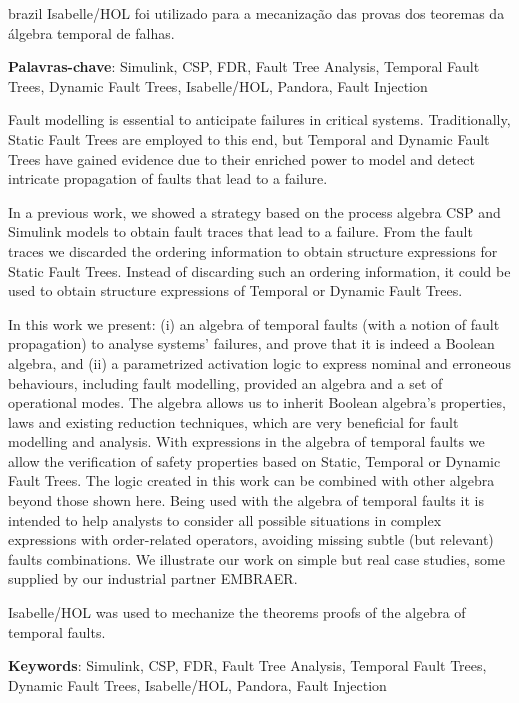\documentclass[12pt,openright,twoside,a4paper,oldfontcommands,english,brazil,final]{abntex2}
\theoremstyle{theo}
\begin{document}
\begin{resumo}[Resumo]
\begin{otherlanguage*}{brazil}
Isabelle/HOL foi utilizado para a mecanização das provas dos teoremas da álgebra temporal de falhas.

\vspace{\onelineskip}
\noindent
\textbf{Palavras-chave}: Simulink, CSP, FDR, Fault Tree Analysis, Temporal Fault Trees, Dynamic Fault Trees, Isabelle/HOL, Pandora, Fault Injection
\end{otherlanguage*}
\end{resumo}



\begin{resumo}
Fault modelling is essential to anticipate failures in critical systems.
Traditionally, Static Fault Trees are employed to this end, but Temporal and Dynamic Fault Trees have gained evidence due to their enriched power to model and detect intricate propagation of faults that lead to a failure.

In a previous work, we showed a strategy based on the process algebra CSP and Simulink models to obtain fault traces that lead to a failure.
From the fault traces we discarded the ordering information to obtain structure expressions for Static Fault Trees.
Instead of discarding such an ordering information, it could be used to obtain structure expressions of Temporal or Dynamic Fault Trees.

In this work we present: (i) an algebra of temporal faults (with a notion of fault propagation) to analyse systems' failures, and prove that it is indeed a Boolean algebra, and (ii) a parametrized activation logic to express nominal and erroneous behaviours, including fault modelling, provided an algebra and a set of operational modes.
The algebra allows us to inherit Boolean algebra's properties, laws and existing reduction techniques, which are very beneficial for fault modelling and analysis.
With expressions in the algebra of temporal faults we allow the verification of safety properties based on Static, Temporal or Dynamic Fault Trees.
The logic created in this work can be combined with other algebra beyond those shown here.
Being used with the algebra of temporal faults it is intended to help analysts to consider all possible situations in complex expressions with order-related operators, avoiding missing subtle (but relevant) faults combinations.
We illustrate our work on simple but real case studies, some supplied by our industrial partner EMBRAER.

Isabelle/HOL was used to mechanize the theorems proofs of the algebra of temporal faults.

\vspace{\onelineskip}
\noindent
{}
\textbf{Keywords}: Simulink, CSP, FDR, Fault Tree Analysis, Temporal Fault Trees, Dynamic Fault Trees, Isabelle/HOL, Pandora, Fault Injection
\end{resumo}
\end{document}
